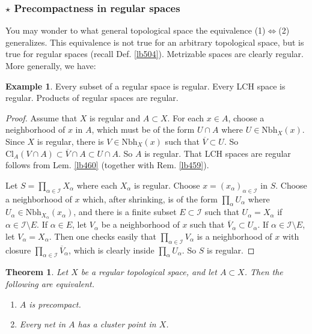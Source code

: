 \documentclass[12pt,b5paper,notitlepage]{article}
\theoremstyle{definition}
\newtheorem{eg}[df]{Example}
\theoremstyle{plain}
\newtheorem{thm}[df]{Theorem}
\newcommand{\ovl}{\overline}
\newcommand{\scr}{\mathscr}
\newcommand{\Nbh}{\mathrm{Nbh}}
\newcommand{\Cl}{\mathrm{Cl}}
\numberwithin{equation}{section}
\begin{document}
\subsubsection{$\star$ Precompactness in regular spaces}

You may wonder to what general topological space the equivalence (1)$\Leftrightarrow$(2) generalizes. This equivalence is not true for an arbitrary topological space, but is true for regular spaces (recall Def. \ref{lb504}). Metrizable spaces are clearly regular. More generally, we have:

\begin{eg}\label{lb506}
Every subset of a regular space is regular. Every LCH space is regular. Products of regular spaces are regular.
\end{eg}

\begin{proof}%
Assume that $X$ is regular and $A\subset X$. For each $x\in A$, choose a neighborhood of $x$ in $A$, which must be of the form $U\cap A$ where $U\in\Nbh_X(x)$. Since $X$ is regular, there is $V\in\Nbh_X(x)$ such that $\ovl V\subset U$. So $\Cl_A(V\cap A)\subset \ovl V\cap A\subset U\cap A$. So $A$ is regular. That LCH spaces are regular follows from Lem. \ref{lb460} (together with Rem. \ref{lb459}).

Let $S=\prod_{\alpha\in\scr I}X_\alpha$ where each $X_\alpha$ is regular. Choose $x=(x_\alpha)_{\alpha\in\scr I}$ in $S$. Choose a neighborhood of $x$ which, after shrinking, is of the form $\prod_\alpha U_\alpha$ where $U_\alpha\in\Nbh_{X_\alpha}(x_\alpha)$, and there is a finite subset $E\subset\scr I$ such that $U_\alpha=X_\alpha$ if $\alpha\in\scr I\setminus E$. If $\alpha\in E$, let $V_\alpha$ be a neighborhood of $x$ such that $\ovl V_\alpha\subset U_\alpha$. If $\alpha\in\scr I\setminus E$, let $V_\alpha=X_\alpha$. Then one checks easily that $\prod_{\alpha\in\scr I} V_\alpha$ is a neighborhood of $x$ with closure $\prod_{\alpha\in\scr I} \ovl V_\alpha$, which is clearly inside $\prod_\alpha U_\alpha$. So $S$ is regular.
\end{proof}


\begin{thm}\label{lb507}
Let $X$ be a regular topological space, and let $A\subset X$. Then the following are equivalent.
\begin{enumerate}[label=(\arabic*)]
\item $A$ is precompact.
\item Every net in $A$ has a cluster point in $X$.
\end{enumerate}
\end{thm}
\end{document}
